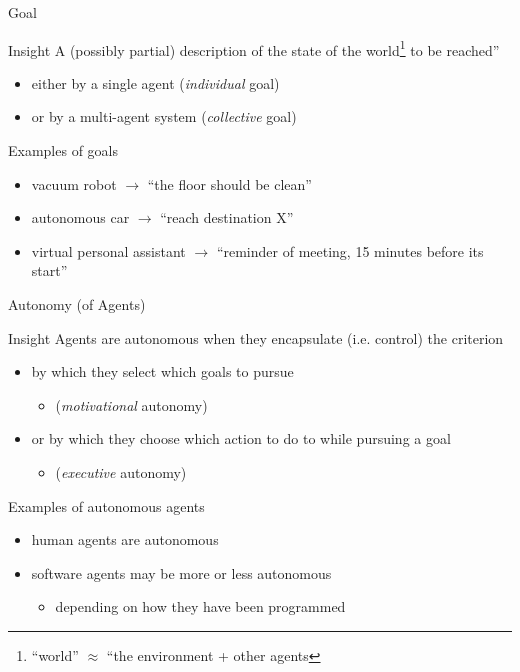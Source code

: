 \documentclass[presentation]{beamer}\mode<presentation>{\usetheme{AMSBolognaFC}}
\begin{document}
\begin{frame}[c]{Goal}
%
\begin{block}{Insight}
	A (possibly partial) description of the state of the world\footnote{``world'' $\approx$ ``the environment + other agents} to be reached''
	\begin{itemize}
		\item either by a single agent (\emph{individual} goal)
		\item or by a multi-agent system (\emph{collective} goal)
	\end{itemize}
\end{block}
%
\begin{exampleblock}{Examples of goals}
	\begin{itemize}
		\item vacuum robot $\rightarrow$ ``the floor should be clean''
		\item autonomous car $\rightarrow$ ``reach destination X''
		\item virtual personal assistant $\rightarrow$ ``reminder of meeting, 15 minutes before its start''
	\end{itemize}
\end{exampleblock}
%
\end{frame}

\begin{frame}[c]{Autonomy (of Agents)}
%
\begin{block}{Insight}
	Agents are \alert{autonomous} when they encapsulate (i.e. control) the criterion
	\begin{itemize}
		\item by which they select which goals to pursue 
		\begin{itemize}
			\item (\emph{motivational} autonomy)
		\end{itemize}
		\item or by which they choose which action to do to while pursuing a goal 
		\begin{itemize}
			\item (\emph{executive} autonomy)
		\end{itemize}
	\end{itemize}
\end{block}
%
\begin{exampleblock}{Examples of autonomous agents}
	\begin{itemize}
		\item human agents are autonomous
		\item software agents may be more or less autonomous 
		\begin{itemize}
			\item depending on how they have been programmed
		\end{itemize}
	\end{itemize}
\end{exampleblock}
%
\end{frame}
\end{document}
